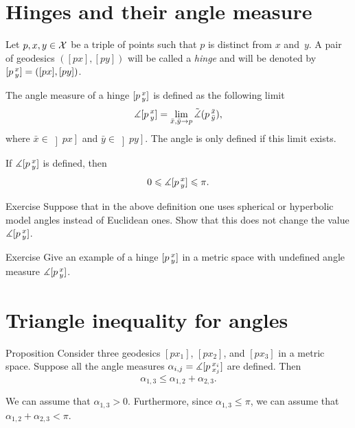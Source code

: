 \section{Hinges and their angle measure}\label{sec:angles}

 Let $p,x,y\in \mathcal{X}$ be a triple of points such that $p$ is distinct from $x$ and~$y$.
A pair of geodesics $([p x],[p y])$ will be called a \emph{hinge} and will be denoted by
$[p\,{}^{x}_{y}]=([p x],[p y])$.

The angle measure of a hinge $[p\,{}^{x}_{y}]$ is defined as the following limit 
\[\measuredangle[p\,{}^{x}_{y}]=\lim_{\bar x,\bar y\to p} \tilde\measuredangle(p\,{}^{\bar x}_{\bar y}),\]
where $\bar x\in\left]p x\right]$ and $\bar y\in\left]p y\right]$.
The angle is only defined if this limit exists.

If $\measuredangle[p\,{}^{x}_{y}]$ is defined, then
\[0\leqslant \measuredangle[p\,{}^{x}_{y}]\leqslant \pi.\]

\begin{thm}{Exercise}\label{ex:angkK}
Suppose that in the above definition one uses spherical or hyperbolic model angles instead of Euclidean ones.
Show that this does not change the value $\measuredangle[p\,{}^{x}_{y}]$.
\end{thm}


\begin{thm}{Exercise}\label{ex:undefined-angle}
Give an example of a hinge $[p\,{}^{x}_{y}]$ in a metric space with undefined angle measure $\measuredangle[p\,{}^{x}_{y}]$.
\end{thm}

\section{Triangle inequality for angles}

\begin{thm}{Proposition}\label{claim:angle-3angle-inq}
Consider three geodesics $[px_1]$, $[px_2]$, and $[px_3]$ in a metric space.
Suppose all the angle measures $\alpha_{i, j}=\measuredangle[p\,{}^{x_i}_{x_j}]$ are defined.
Then 
\[\alpha_{1,3}\le \alpha_{1,2}+\alpha_{2,3}.\]

\end{thm}



We can assume that $\alpha_{1,3}>0$.
Furthermore, since $\alpha_{1,3}\le\pi$, we can assume that $\alpha_{1,2}+\alpha_{2,3}< \pi$.

